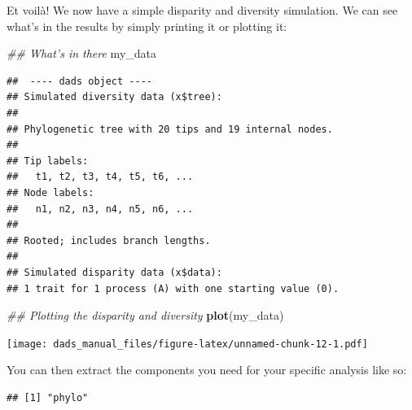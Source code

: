 \documentclass[]{book}
\newenvironment{Shaded}{\begin{snugshade}}{\end{snugshade}}
\newcommand{\CommentTok}[1]{\textcolor[rgb]{0.56,0.35,0.01}{\textit{#1}}}
\newcommand{\KeywordTok}[1]{\textcolor[rgb]{0.13,0.29,0.53}{\textbf{#1}}}
\newcommand{\NormalTok}[1]{#1}
\newcommand{\OperatorTok}[1]{\textcolor[rgb]{0.81,0.36,0.00}{\textbf{#1}}}
\newcommand{\StringTok}[1]{\textcolor[rgb]{0.31,0.60,0.02}{#1}}
\begin{document}
Et voilà! We now have a simple disparity and diversity simulation.
We can see what's in the results by simply printing it or plotting it:

\begin{Shaded}
\begin{Highlighting}[]
\CommentTok{## What's in there}
\NormalTok{my_data}
\end{Highlighting}
\end{Shaded}

\begin{verbatim}
##  ---- dads object ---- 
## Simulated diversity data (x$tree):
## 
## Phylogenetic tree with 20 tips and 19 internal nodes.
## 
## Tip labels:
##   t1, t2, t3, t4, t5, t6, ...
## Node labels:
##   n1, n2, n3, n4, n5, n6, ...
## 
## Rooted; includes branch lengths.
## 
## Simulated disparity data (x$data):
## 1 trait for 1 process (A) with one starting value (0).
\end{verbatim}

\begin{Shaded}
\begin{Highlighting}[]
\CommentTok{## Plotting the disparity and diversity}
\KeywordTok{plot}\NormalTok{(my_data)}
\end{Highlighting}
\end{Shaded}

\texttt{[image: dads\_manual\_files/figure-latex/unnamed-chunk-12-1.pdf]}

You can then extract the components you need for your specific analysis like so:

\begin{Shaded}
\end{Shaded}

\begin{verbatim}
## [1] "phylo"
\end{verbatim}

\begin{Shaded}
\end{Shaded}
\end{document}
